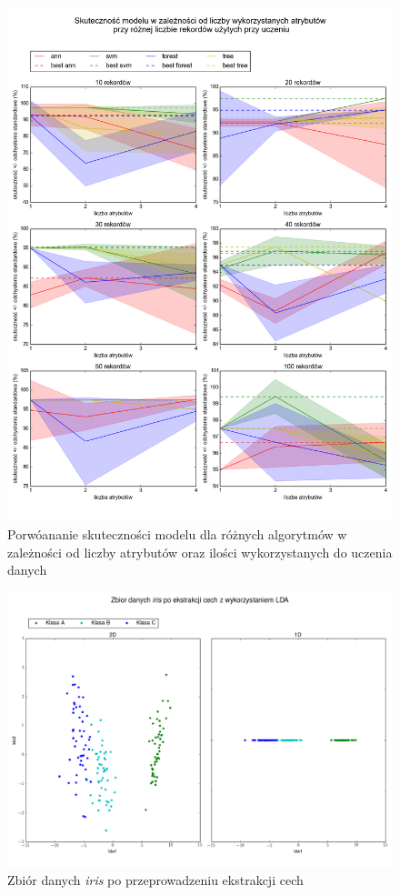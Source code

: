 \begin{figure}[ht!]
\centering
\includegraphics[scale=0.45]{res/extractionSummary.png}
\caption[Caption for LOF]{Porwóananie skuteczności modelu dla różnych algorytmów w zależności od liczby atrybutów oraz ilości wykorzystanych do uczenia danych\label{extractionSummary}}
\end{figure} 

\begin{figure}[ht!]
\centering
\includegraphics[scale=0.45]{res/showMeIris.png}
\caption[Caption for LOF]{Zbiór danych \textit{iris} po przeprowadzeniu ekstrakcji cech\label{showMeIris}}
\end{figure} 


